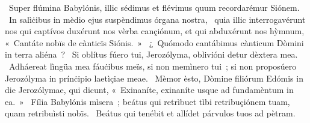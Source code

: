 \psalmChapterWithInscription{}
{ }
{%
~Super flúmina Babylónis, illic sédimus et flévimus quum recordarémur Siónem. 
~In salìċibus in mèdio ejus suspèndimus órgana nostra, 
~quia illic interrogavérunt nos qui captívos duxérunt nos vèrba cançiónum, et qui abduxérunt nos hỳmnum, «~Cantáte nobïs de cànticïs Siónis.~»
~¿~Quómodo cantábimus cànticum Dòmini in terra aliéna~? 
~Si oblítus fúero tui, Jerozólyma, oblivióni detur dèxtera mea. 
~Adháereat lìngüa mea fáuċibus meïs, si non memìnero tui~; si non proposúero Jerozólyma in prínċipio laetìçiae meae. 
~Mèmor èsto, Dòmine filiórum Edómis in die Jerozólymae, qui dicunt, «~Exinaníte, exinaníte usque ad fundamèntum in ea.~»
~Fília Babylónis mìsera~; beátus qui retrìbuet tìbi retribuçiónem tuam, quam retribuìsti nobïs. 
~Beátus qui tenébit et allídet párvulos tuos ad pètram. 
}
